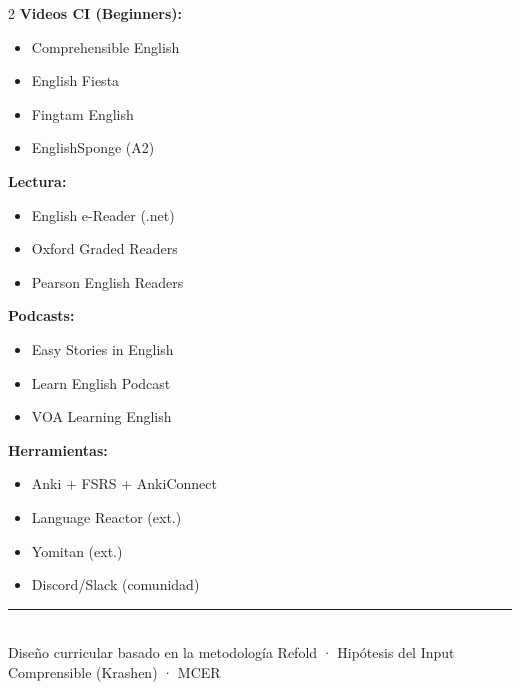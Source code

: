 \documentclass[12pt,a4paper]{article}
\begin{document}
\begin{cajanota}
\begin{multicols}{2}
\textbf{Videos CI (Beginners):}
\begin{itemize}[leftmargin=0.8cm, nosep]
  \item Comprehensible English
  \item English Fiesta
  \item Fingtam English
  \item EnglishSponge (A2)
\end{itemize}

\textbf{Lectura:}
\begin{itemize}[leftmargin=0.8cm, nosep]
  \item English e-Reader (.net)
  \item Oxford Graded Readers
  \item Pearson English Readers
\end{itemize}

\columnbreak

\textbf{Podcasts:}
\begin{itemize}[leftmargin=0.8cm, nosep]
  \item Easy Stories in English
  \item Learn English Podcast
  \item VOA Learning English
\end{itemize}

\textbf{Herramientas:}
\begin{itemize}[leftmargin=0.8cm, nosep]
  \item Anki + FSRS + AnkiConnect
  \item Language Reactor (ext.)
  \item Yomitan (ext.)
  \item Discord/Slack (comunidad)
\end{itemize}
\end{multicols}
\end{cajanota}

\vfill
\begin{center}
\rule{0.5\textwidth}{0.5pt}\\[0.3cm]
{\small\color{grissuave} Diseño curricular basado en la metodología Refold · Hipótesis del Input Comprensible (Krashen) · MCER}
\end{center}
\end{document}
